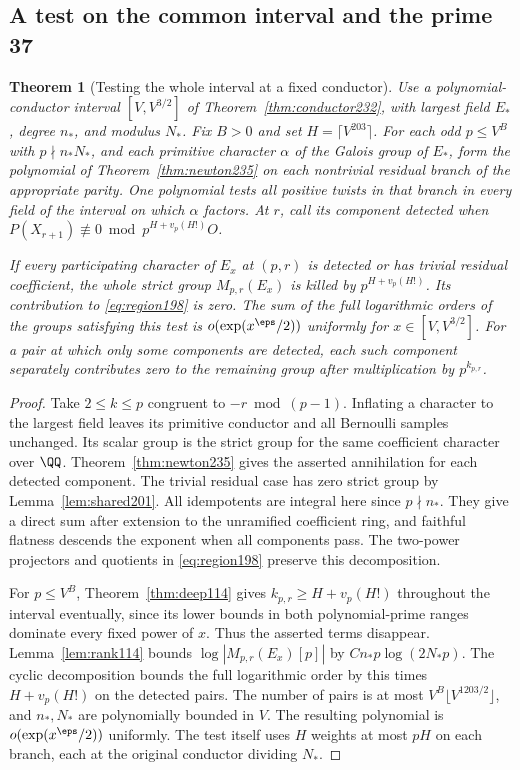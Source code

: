 \documentclass[a4paper,11pt]{article}
\newtheorem{theorem}[proposition]{Theorem}
\theoremstyle{definition}
\theoremstyle{remark}
\numberwithin{equation}{section}
\begin{document}
\subsection{A test on the common interval and the prime 37}\label{nav:II-43}
\begin{theorem}[Testing the whole interval at a fixed conductor]
\leavevmode\label{thm:twists235}
Use a polynomial-conductor interval \([V,V^{3/2}]\) of
Theorem~\ref{thm:conductor232}, with largest field \(E_*\),
degree \(n_*\), and modulus \(N_*\). Fix \(B>0\) and set
\(H=\lceil V^{203}\rceil\). For each odd \(p\le V^B\) with
\(p\nmid n_*N_*\), and each primitive character \(\alpha\) of
the Galois group of \(E_*\), form the polynomial of
Theorem~\ref{thm:newton235} on each nontrivial residual branch
of the appropriate parity. One polynomial tests all positive
twists in that branch in every field of the interval on which
\(\alpha\) factors. At \(r\), call its component detected when
\(P(X_{r+1})\not\equiv0\bmod p^{H+v_p(H!)}O\).

If every participating character of \(E_x\) at \((p,r)\) is
detected or has trivial residual coefficient, the whole strict
group \(M_{p,r}(E_x)\) is killed by \(p^{H+v_p(H!)}\). Its
contribution to \eqref{eq:region198} is zero. The sum of the
full logarithmic orders of the groups satisfying this test is
\(o(\exp(x^\eps/2))\) uniformly for \(x\in[V,V^{3/2}]\).
For a pair at which only some components are detected, each
such component separately contributes zero to the remaining
group after multiplication by \(p^{k_{p,r}}\).
\end{theorem}
\begin{proof}
Take \(2\le k\le p\) congruent to \(-r\bmod(p-1)\).
Inflating a character to the largest field leaves its primitive
conductor and all Bernoulli samples unchanged. Its scalar group
is the strict group for the same coefficient character over
\(\QQ\). Theorem~\ref{thm:newton235} gives the asserted
annihilation for each detected component. The trivial residual
case has zero strict group by Lemma~\ref{lem:shared201}.
All idempotents are integral here since \(p\nmid n_*\).
They give a direct sum after extension to the unramified
coefficient ring, and faithful flatness descends the exponent
when all components pass. The two-power projectors and
quotients in \eqref{eq:region198} preserve this decomposition.

For \(p\le V^B\), Theorem~\ref{thm:deep114} gives
\(k_{p,r}\ge H+v_p(H!)\) throughout the interval eventually,
since its lower bounds in both polynomial-prime ranges dominate
every fixed power of \(x\). Thus the asserted terms disappear.
Lemma~\ref{lem:rank114} bounds \(\log|M_{p,r}(E_x)[p]|\) by
\(C n_*p\log(2N_*p)\). The cyclic decomposition bounds the
full logarithmic order by this times \(H+v_p(H!)\) on the
detected pairs. The number of pairs is at most
\(V^B\lfloor V^{1203/2}\rfloor\), and \(n_*,N_*\) are
polynomially bounded in \(V\). The resulting polynomial is
\(o(\exp(x^\eps/2))\) uniformly. The test itself uses
\(H\) weights at most \(pH\) on each branch, each at the
original conductor dividing \(N_*\).
\end{proof}
\end{document}
